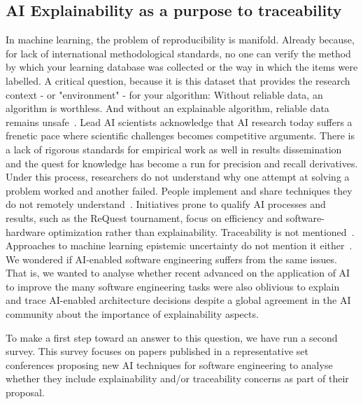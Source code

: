 \subsection{AI Explainability as a purpose to traceability}
\label{sec:explainability}

In machine learning, the problem of reproducibility is manifold. Already because, for lack of international methodological standards, no one can verify the method by which your learning database was collected or the way in which the items were labelled. 
A critical question, because it is this dataset that provides the research context - or "environment" - for your algorithm: Without reliable data, an algorithm is worthless. And without an explainable algorithm, reliable data remains unsafe~\cite{beam2020-ai-reproduciblity-in-health,avital2018-realistic-evaluation-of-ai}. 
Lead AI scientists acknowledge that AI research today suffers a frenetic pace where scientific challenges becomes competitive arguments. There is a lack of rigorous standards for empirical work as well in results dissemination and the quest for knowledge has become a run for precision and recall derivatives. Under this process, researchers do not understand why one attempt at solving a problem worked and another failed. People implement and share techniques they do not remotely understand~\cite{sculley2018-winners-curse-progress-empirical-rigor}. Initiatives prone to qualify AI processes and results, such as the ReQuest tournament, focus on efficiency and software-hardware optimization rather than explainability. Traceability is not mentioned~\cite{request2018}. Approaches to machine learning epistemic uncertainty do not mention it either~\cite{hllermeier2019-aleatoric-and-epistemic-uncertiainty-in-ml}.\\

We wondered if AI-enabled software engineering suffers from the same issues. That is, we wanted to analyse whether recent advanced on the application of AI to improve the many software engineering tasks were also oblivious to explain and trace AI-enabled architecture decisions despite a global agreement in the AI community about the importance of explainability aspects.

To make a first step toward an answer to this question, we have run a second survey. This survey focuses on papers published in a representative set conferences proposing new AI techniques for software engineering to analyse whether they include explainability and/or traceability concerns as part of their proposal.

